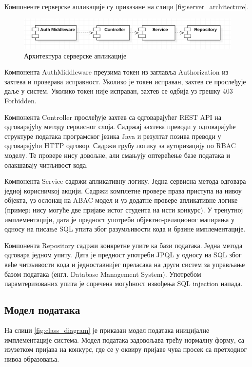 \documentclass[a4paper]{article}
\begin{document}
Компоненте серверске апликације су приказане на слици \autoref{fig:server_architecture}.

\begin{figure}[H]
    \centering
    \includegraphics{images/server_architecture.png}
    \caption{Архитектура серверске апликације}
    \label{fig:server_architecture}
\end{figure}

Компонента AuthMiddleware преузима токен из заглавља Authorization из захтева и проверава исправност. Уколико је токен 
исправан, захтев се прослеђује даље у систем. Уколико токен није исправан, захтев се одбија уз грешку 403 Forbidden.

Компонента Controller прослеђује захтев са одговарајућег REST API на одговарајућу методу сервисног слоја. Садржај
захтева преводи у одговарајуће структуре података програмског језика Java и резултат позива преводи у одговарајући HTTP одговор. Садржи грубу логику за ауторизацију по RBAC моделу. Те провере нису довољне, али смањују оптерећење базе података и олакшавају читљивост кода.

Компонента Service садржи апликативну логику. Једна сервисна метода одговара једној корисничкој акцији. Садржи комплетне
провере права приступа на нивоу објекта, уз ослонац на ABAC модел и уз додатне провере апликативне логике
(пример: нису могуће две пријаве истог студента на исти конкурс). У тренутној имплементацији, дата је предност употреби
објектно-релационог мапирања у односу на писање SQL упита због разумљивости кода и брзине имплементације.

Компонента Repository садржи конкретне упите ка бази података. Једна метода одговара једном упиту. Дата је предност
употреби JPQL у односу на SQL због веће читљивости кода и једноставнијег преласака на други систем за управљање базом података (енгл. Database Management System). Употребом парамтеризованих упита је спречена могућност извођења SQL injection напада.

\subsection*{Модел података}

На слици \autoref{fig:class_diagram} је приказан модел података иницијалне имплементације система. Модел података задовољава трећу нормалну форму, са
изузетком пријава на конкурс, где се у оквиру пријаве чува просек са претходног нивоа образовања.
\end{document}
